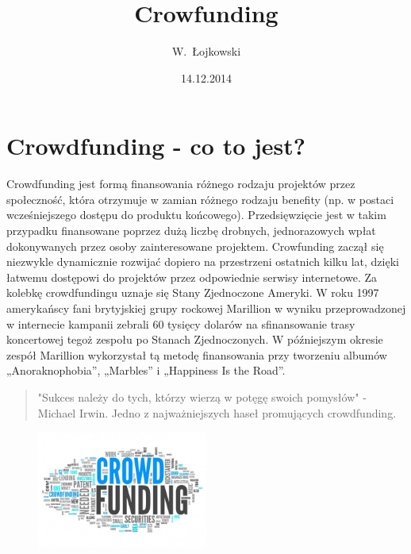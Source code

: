 \documentclass[12pt, a4paper]{article}
\author{W.~Łojkowski}
\title{Crowfunding}
\date{14.12.2014}
\begin{document}
\maketitle

\tableofcontents


\newpage
\section{Crowdfunding - co to jest?}
\label{sec:wstęp}


	Crowdfunding jest formą finansowania różnego rodzaju projektów przez społeczność, która otrzymuje w zamian różnego rodzaju benefity (np. w postaci wcześniejszego dostępu do produktu końcowego). Przedsięwzięcie jest w takim przypadku finansowane poprzez dużą liczbę drobnych, jednorazowych wpłat dokonywanych przez osoby zainteresowane projektem. Crowfunding zaczął się niezwykle dynamicznie rozwijać dopiero na przestrzeni ostatnich kilku lat, dzięki łatwemu dostępowi do projektów przez odpowiednie serwisy internetowe. Za kolebkę crowdfundingu uznaje się Stany Zjednoczone Ameryki. W roku 1997 amerykańscy fani brytyjskiej grupy rockowej Marillion w wyniku przeprowadzonej w internecie kampanii zebrali 60 tysięcy dolarów na sfinansowanie trasy koncertowej tegoż zespołu po Stanach Zjednoczonych. W późniejszym okresie zespół Marillion wykorzystał tą metodę finansowania przy tworzeniu albumów „Anoraknophobia”, „Marbles” i „Happiness Is the Road”.
	
	\begin{quote}
"Sukces należy do tych, którzy wierzą w potęgę swoich pomysłów" - Michael Irwin. Jedno z najważniejszych haseł promujących crowdfunding.
\end{quote}

\begin{figure}[h]
	\centering
		\includegraphics[width=0.50\textwidth]{crow.jpg}
	\caption{}
	\label{fig:images}
\end{figure}
\newpage
\end{document}
